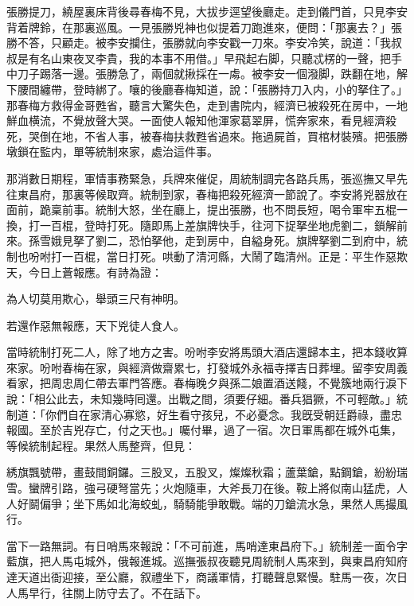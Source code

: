 張勝提刀，繞屋裏床背後尋春梅不見，大拔步逕望後廳走。走到儀門首，只見李安背着牌鈴，在那裏巡風。一見張勝兇神也似提着刀跑進來，便問：「那裏去？」張勝不答，只顧走。被李安攔住，張勝就向李安戳一刀來。李安冷笑，說道：「我叔叔是有名山東夜叉李貴，我的本事不用借。」早飛起右脚，只聽忒楞的一聲，把手中刀子踢落一邊。張勝急了，兩個就揪採在一䖏。被李安一個潑脚，跌翻在地，解下腰間纏帶，登時綁了。嚷的後廳春梅知道，說：「張勝持刀入内，小的拏住了。」那春梅方救得金哥甦省，聽言大驚失色，走到書院内，經濟已被殺死在房中，一地鮮血横流，不覺放聲大哭。一面使人報知他渾家葛翠屏，慌奔家來，看見經濟殺死，哭倒在地，不省人事，被春梅扶救甦省過來。拖過屍首，買棺材裝殯。把張勝墩鎖在監内，單等統制來家，處治這件事。

那消數日期程，軍情事務緊急，兵牌來催促，周統制調完各路兵馬，張巡撫又早先往東昌府，那裏等候取齊。統制到家，春梅把殺死經濟一節說了。李安將兇器放在面前，跪稟前事。統制大怒，坐在廳上，提出張勝，也不問長短，喝令軍牢五棍一換，打一百棍，登時打死。隨即馬上差旗牌快手，往河下捉拏坐地虎劉二，鎖解前來。孫雪娥見拏了劉二，恐怕拏他，走到房中，自縊身死。旗牌拏劉二到府中，統制也吩咐打一百棍，當日打死。哄動了清河縣，大鬧了臨清州。正是：平生作惡欺天，今日上蒼報應。有詩為證：

\begin{myquote}
為人切莫用欺心，舉頭三尺有神明。

若還作惡無報應，天下兇徒人食人。
\end{myquote}

當時統制打死二人，除了地方之害。吩咐李安將馬頭大酒店還歸本主，把本錢收算來家。吩咐春梅在家，與經濟做齋累七，打發城外永福寺擇吉日葬埋。留李安周義看家，把周忠周仁帶去軍門答應。春梅晚夕與孫二娘置酒送餞，不覺簇地兩行淚下說：「相公此去，未知幾時囘還。出戰之間，須要仔細。番兵猖獗，不可輕敵。」統制道：「你們自在家清心寡慾，好生看守孩兒，不必憂念。我旣受朝廷爵祿，盡忠報國。至於吉兇存亡，付之天也。」囑付畢，過了一宿。次日軍馬都在城外屯集，等候統制起程。果然人馬整齊，但見：

\begin{myquote}
綉旗飄號帶，畫鼓間銅鑼。三股叉，五股叉，燦燦秋霜；蘆葉鎗，點鋼鎗，紛紛瑞雪。蠻牌引路，強弓硬弩當先；火炮隨車，大斧長刀在後。鞍上將似南山猛虎，人人好鬬偏爭；坐下馬如北海蛟虬，騎騎能爭敢戰。端的刀鎗流水急，果然人馬撮風行。
\end{myquote}

當下一路無詞。有日哨馬來報說：「不可前進，馬哨達東昌府下。」統制差一面令字藍旗，把人馬屯城外，俄報進城。巡撫張叔夜聽見周統制人馬來到，與東昌府知府達天道出衙迎接，至公廳，叙禮坐下，商議軍情，打聽聲息緊慢。駐馬一夜，次日人馬早行，往關上防守去了。不在話下。

